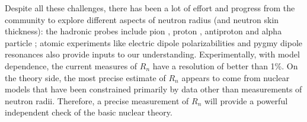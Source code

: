Despite all these challenges, there has been a lot of effort and progress from the community 
to explore different aspects of neutron radius (and neutron skin thickness): 
the hadronic probes include pion \cite{ALLARDYCE19731}, proton \cite{LOMBARDI1972103,PhysRevC.82.044611}, 
antiproton \cite{PhysRevC.76.014311} and alpha particle \cite{KRASZNAHORKAY2004224};
atomic experiments like electric dipole polarizabilities \cite{Roca_Maza_2012} and 
pygmy dipole resonances \cite{PhysRevC.88.044610}
also provide inputs to our understanding.
Experimentally, with model dependence, the current measures of $R_n$ have a resolution of better than 1\%.
On the theory side, the most precise estimate of $R_n$ appears to come from nuclear models
that have been constrained primarily by data other than measurements	%
of neutron radii. Therefore, a precise measurement of $R_n$ will provide a powerful 
independent check of the basic nuclear theory.
\begin{comment}
\item proton
    \begin{itemize}
	\item high-energy polarized proton
	\item Relativistic Impulse Approximation (RIA) with free nucleon-nucleon interaction
    \end{itemize}
\item pion
    \begin{itemize}
	\item in the $\Delta(1332)$ region, $\pi^- N$ interaction is 3 times larger than $\pi^- p$.
	\item strong absorption at the surface, sensitive to the tail of neutron distributions;
	    increase pion energy to reduce xsection
	\item applicable to only light stable nuclei
    \end{itemize}
\item antiproton
    \begin{itemize}
	\item slow antiproton capture (like an electron)
    \end{itemize}
\item PVES
\item GDR: Giant Dipole Resonance
\item SDR: Spin-Dipole Resonance
\end{comment}

